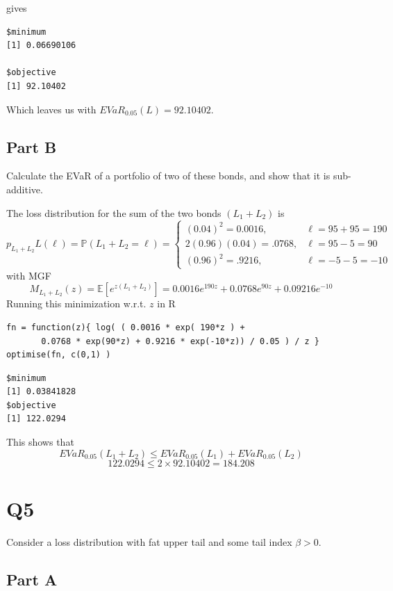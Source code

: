 \documentclass[
  oneside]{book}
\begin{document}
gives

\begin{verbatim}
$minimum
[1] 0.06690106

$objective
[1] 92.10402
\end{verbatim}

Which leaves us with \(EVaR_{0.05}(L) = 92.10402\).

\hypertarget{part-b-11}{%
\subsection{Part B}\label{part-b-11}}

Calculate the EVaR of a portfolio of two of these bonds, and show that it is sub-additive.

The loss distribution for the sum of the two bonds \(\left(L_1+L_2\right)\) is
\[
p_{L_1+L_2} L(\ell)=\mathbb{P}\left(L_1+L_2=\ell\right)= \begin{cases}(0.04)^2=0.0016, & \ell=95+95=190 \\ 2(0.96)(0.04)=.0768, & \ell=95-5=90 \\ (0.96)^2=.9216, & \ell=-5-5=-10\end{cases}
\]
with MGF
\[
M_{L_1+L_2}(z)=\mathbb{E}\left[e^{z\left(L_1+L_2\right)}\right]=0.0016 e^{190 z}+0.0768 e^{90 z}+0.09216 e^{-10}
\]
Running this minimization w.r.t. \(z\) in \(\mathrm{R}\)

\begin{verbatim}
fn = function(z){ log( ( 0.0016 * exp( 190*z ) +
       0.0768 * exp(90*z) + 0.9216 * exp(-10*z)) / 0.05 ) / z }
optimise(fn, c(0,1) )
\end{verbatim}

\begin{verbatim}
$minimum
[1] 0.03841828
$objective
[1] 122.0294
\end{verbatim}

This shows that
\[
EVaR_{0.05}(L_{1}+L_{2}) \leq EVaR_{0.05}(L_{1}) + EVaR_{0.05}(L_{2})
\]
\[
122.0294 \leq 2 \times 92.10402 = 184.208
\]

\hypertarget{q5-1}{%
\section{Q5}\label{q5-1}}

Consider a loss distribution with fat upper tail and some tail index \(\beta > 0\).

\hypertarget{part-a-13}{%
\subsection{Part A}\label{part-a-13}}
\end{document}
